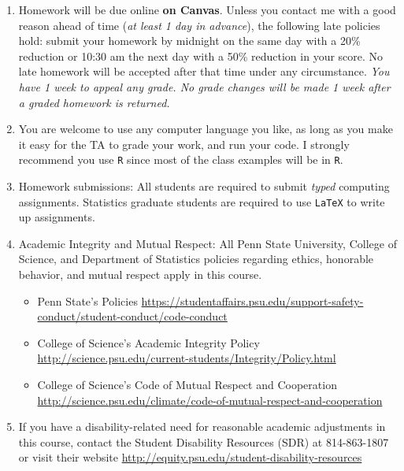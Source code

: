 \documentclass[10pt]{article}
\begin{document}
\begin{enumerate}
\item Homework will be due online {\bf on Canvas}. Unless you contact me with a good reason ahead of time ({\it at least 1 day
    in advance}), the following late policies hold: submit your
  homework by midnight on the same day with
  a 20\% reduction or 10:30 am the next day with a 50\% reduction in
  your score. No late homework will be accepted after that time under
  any circumstance. {\it You have 1 week to appeal any grade. No grade
    changes will be made 1 week after a graded homework is returned.}  
\item You are welcome to use any computer language you like, as long
  as you make it easy for the TA to grade your work, and run your code. I strongly recommend you use {\tt R} since most of the class examples will be in {\tt R}.  
\item Homework submissions: All students are required to submit {\it
    typed} computing assignments. Statistics graduate students are
  required to use {\tt LaTeX} to write up assignments. %
\item Academic Integrity and Mutual Respect: All Penn State University, College of Science, and 
Department of Statistics policies regarding ethics, honorable behavior, and mutual respect apply in 
this course. %
\begin{itemize}
\item Penn State's Policies \url{https://studentaffairs.psu.edu/support-safety-conduct/student-conduct/code-conduct}
\item College of Science's Academic Integrity Policy \url{http://science.psu.edu/current-students/Integrity/Policy.html}
\item College of Science's Code of Mutual Respect and Cooperation
  \url{http://science.psu.edu/climate/code-of-mutual-respect-and-cooperation}
\end{itemize}
\item If you have a disability-related need for
reasonable academic adjustments in this course, contact the Student Disability Resources (SDR) at 814-863-1807 or visit their website \url{http://equity.psu.edu/student-disability-resources}
\end{enumerate}
\end{document}
